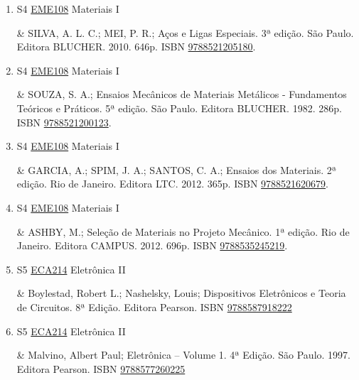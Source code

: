\documentclass[12pt,a4paper]{book}
\begin{document}
\begin{enumerate}
 \item S4 \hyperref[PUD:EME108]{EME108} Materiais I

& SILVA, A.  L.  C.;  MEI, P.  R.;  Aços e Ligas Especiais.  3ª edição.  São Paulo.  Editora BLUCHER.  2010.  646p.  ISBN \href{http://www.bn.br/site/pages/servicosProfissionais/agenciaISBN/isbnBusca/FbnBuscaISBNCatalogo.asp?pField=ISBN&pIntPagina=1&pISBN=21205180&nidbISBN=true&hidbISBN=true}{9788521205180}.
 \item S4 \hyperref[PUD:EME108]{EME108} Materiais I

& SOUZA, S.  A.;  Ensaios Mecânicos de Materiais Metálicos - Fundamentos Teóricos e Práticos.  5ª edição.  São Paulo.  Editora BLUCHER.  1982.  286p.  ISBN \href{http://www.bn.br/site/pages/servicosProfissionais/agenciaISBN/isbnBusca/FbnBuscaISBNCatalogo.asp?pField=ISBN&pIntPagina=1&pISBN=21200123&nidbISBN=true&hidbISBN=true}{9788521200123}. 
 

 \item S4 \hyperref[PUD:EME108]{EME108} Materiais I

& GARCIA, A.;  SPIM, J.  A.;  SANTOS, C.  A.;  Ensaios dos Materiais.  2ª edição.  Rio de Janeiro.  Editora LTC.  2012.  365p.  ISBN \href{http://www.bn.br/site/pages/servicosProfissionais/agenciaISBN/isbnBusca/FbnBuscaISBNCatalogo.asp?pField=ISBN&pIntPagina=1&pISBN=21620679&nidbISBN=true&hidbISBN=true}{9788521620679}. 
 

 \item S4 \hyperref[PUD:EME108]{EME108} Materiais I

&  ASHBY, M.;  Seleção de Materiais no Projeto Mecânico.  1ª edição.  Rio de Janeiro.  Editora CAMPUS.  2012.  696p.  ISBN \href{http://www.bn.br/site/pages/servicosProfissionais/agenciaISBN/isbnBusca/FbnBuscaISBNCatalogo.asp?pField=ISBN&pIntPagina=1&pISBN=35245219&nidbISBN=true&hidbISBN=true}{9788535245219}.
 \item S5 \hyperref[PUD:ECA214]{ECA214} Eletrônica II

& Boylestad, Robert L.;  Nashelsky, Louis;  Dispositivos Eletrônicos e Teoria de Circuitos.  8ª Edição.  Editora Pearson.  ISBN \href{http://www.bn.br/site/pages/servicosProfissionais/agenciaISBN/isbnBusca/FbnBuscaISBNCatalogo.asp?pField=ISBN&pIntPagina=1&pISBN=87918222&nidbISBN=true&hidbISBN=true}{9788587918222}
 

 \item S5 \hyperref[PUD:ECA214]{ECA214} Eletrônica II

& Malvino, Albert Paul;  Eletrônica – Volume 1.  4ª Edição.  São Paulo.  1997.  Editora Pearson.  ISBN \href{http://www.bn.br/site/pages/servicosProfissionais/agenciaISBN/isbnBusca/FbnBuscaISBNCatalogo.asp?pField=ISBN&pIntPagina=1&pISBN=77260225&nidbISBN=true&hidbISBN=true}{9788577260225}
 


\end{enumerate}
\end{document}
